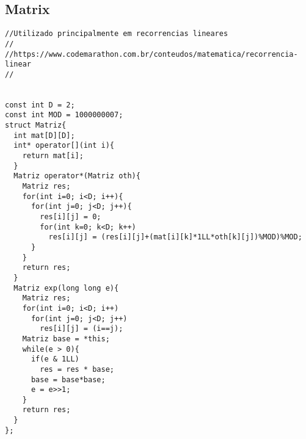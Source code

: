 \documentclass[11pt, a4paper, twoside]{article}
\begin{document}
\subsection{Matrix}
\begin{verbatim}
//Utilizado principalmente em recorrencias lineares
//
//https://www.codemarathon.com.br/conteudos/matematica/recorrencia-linear
//


const int D = 2;
const int MOD = 1000000007;
struct Matriz{
  int mat[D][D];
  int* operator[](int i){
    return mat[i];
  }
  Matriz operator*(Matriz oth){
    Matriz res;
    for(int i=0; i<D; i++){
      for(int j=0; j<D; j++){
        res[i][j] = 0;
        for(int k=0; k<D; k++)
          res[i][j] = (res[i][j]+(mat[i][k]*1LL*oth[k][j])%MOD)%MOD;
      }
    }
    return res;
  }
  Matriz exp(long long e){
    Matriz res;
    for(int i=0; i<D; i++)
      for(int j=0; j<D; j++)
        res[i][j] = (i==j);    
    Matriz base = *this;  
    while(e > 0){
      if(e & 1LL)
        res = res * base;
      base = base*base;
      e = e>>1;
    }
    return res;
  }
};
\end{verbatim}
\end{document}
